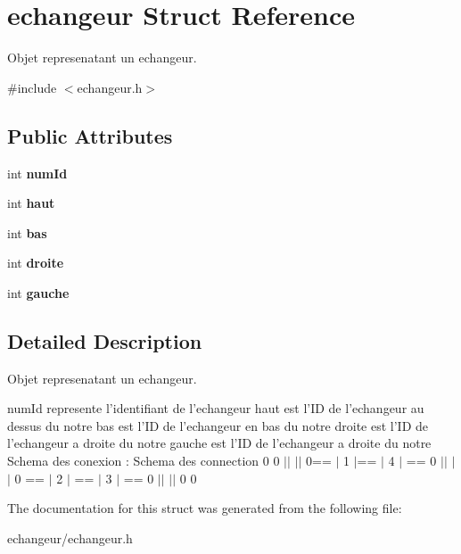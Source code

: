 \hypertarget{structechangeur}{\section{echangeur Struct Reference}
\label{structechangeur}
}


Objet represenatant un echangeur.  




{\ttfamily \#include $<$echangeur.\-h$>$}

\subsection*{Public Attributes}
\begin{DoxyCompactItemize}
\item 
\hypertarget{structechangeur_a7beda1896a25d2d1bda61a23e84da97f}{int {\bfseries num\-Id}}\label{structechangeur_a7beda1896a25d2d1bda61a23e84da97f}

\item 
\hypertarget{structechangeur_a8d3f111b1550e4f17817cab0067e3479}{int {\bfseries haut}}\label{structechangeur_a8d3f111b1550e4f17817cab0067e3479}

\item 
\hypertarget{structechangeur_ac0f731f7496adceab80c3484f306f813}{int {\bfseries bas}}\label{structechangeur_ac0f731f7496adceab80c3484f306f813}

\item 
\hypertarget{structechangeur_a531e055d86f8b2a5a6c00b362865e959}{int {\bfseries droite}}\label{structechangeur_a531e055d86f8b2a5a6c00b362865e959}

\item 
\hypertarget{structechangeur_a587d8e44144c480c74d3c8090a01bf5d}{int {\bfseries gauche}}\label{structechangeur_a587d8e44144c480c74d3c8090a01bf5d}

\end{DoxyCompactItemize}


\subsection{Detailed Description}
Objet represenatant un echangeur. 

num\-Id represente l'identifiant de l'echangeur haut est l'I\-D de l'echangeur au dessus du notre bas est l'I\-D de l'echangeur en bas du notre droite est l'I\-D de l'echangeur a droite du notre gauche est l'I\-D de l'echangeur a droite du notre Schema des conexion \-: Schema des connection 0 0 $\vert$$\vert$ $\vert$$\vert$ 0== $\vert$ 1 $\vert$== $\vert$ 4 $\vert$ == 0 $\vert$$\vert$ $\vert$$\vert$ 0 == $\vert$ 2 $\vert$ == $\vert$ 3 $\vert$ == 0 $\vert$$\vert$ $\vert$$\vert$ 0 0 

The documentation for this struct was generated from the following file\-:\begin{DoxyCompactItemize}
\item 
echangeur/echangeur.\-h\end{DoxyCompactItemize}
